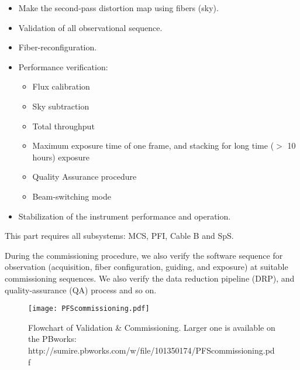 \begin{enumerate}
\begin{itemize}
 \item Make the second-pass distortion map using fibers (sky).
 \item Validation of all observational sequence.
 \item Fiber-reconfiguration.
 \item Performance verification:
 	\begin{itemize}
	\item Flux calibration
	\item Sky subtraction
	\item Total throughput
	\item Maximum exposure time of one frame, and stacking for long time ($>$ 10 hours) exposure
	\item Quality Assurance procedure
	\item Beam-switching mode
 \end{itemize}
 \item Stabilization of the instrument performance and operation.
 \end{itemize}
This part requires all subsystems: MCS, PFI, Cable B and SpS.
\end{enumerate}

During the commissioning procedure, we also verify the software sequence for observation (acquisition, fiber configuration, guiding, and exposure) at suitable commissioning sequences.
We also verify the data reduction pipeline (DRP), and quality-assurance (QA) process and so on.

\begin{landscape}
\begin{figure}[!ht]
\begin{center}
\vspace*{0mm}
\hspace*{-10mm}
\texttt{[image: PFScommissioning.pdf]}
\end{center}
\vspace*{-8mm}
\caption{Flowchart of Validation \& Commissioning. Larger one is available on the PBworks: \newline
http://sumire.pbworks.com/w/file/101350174/PFScommissioning.pdf
}
\label{fig:flowchart}
\end{figure}
\end{landscape}


